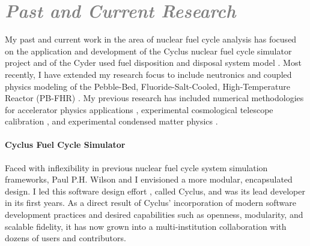 \documentclass[a4paper, 12pt]{article}
\begin{document}
\section*{\textcolor{gray}{\it Past and Current Research}}

My past and current work in the area of nuclear fuel cycle analysis has focused 
on the application and development of the Cyclus nuclear fuel cycle simulator 
project \cite{cyclus_github_2011} and of the Cyder used fuel disposition and 
disposal system model \cite{cyder_github_2012, huff_integrated_2013}. Most 
recently, I have extended my research focus to include neutronics and coupled 
physics modeling of the Pebble-Bed, Fluoride-Salt-Cooled, High-Temperature 
Reactor (PB-FHR) \cite{facilitators_fluoride-salt-cooled_2013, 
facilitators_fluoride-salt-cooled_2013-1, 
facilitators_fluoride-salt-cooled_2013-2, 
facilitators_fluoride-salt-cooled_2013-3}.  My previous research has included 
numerical methodologies for accelerator physics applications 
\cite{huff_single_2003, huff_digital_2004}, experimental cosmological telescope 
calibration \cite{huff_celestial_2008}, and experimental condensed matter 
physics \cite{clerc_liquid_2008}. 



\paragraph{Cyclus Fuel Cycle Simulator} Faced with inflexibility in previous 
nuclear fuel cycle system simulation frameworks, Paul P.H. Wilson and I 
envisioned a more modular, encapsulated design. I led this software design effort 
\cite{huff_open_2011, huff_cyclus_2011}, called Cyclus, and was its lead 
developer in its first years.  As a direct result of 
Cyclus' incorporation of modern software development practices and desired 
capabilities such as openness, modularity, and scalable fidelity, it has now 
grown into a multi-institution collaboration with dozens of users and 
contributors. 
\end{document}
